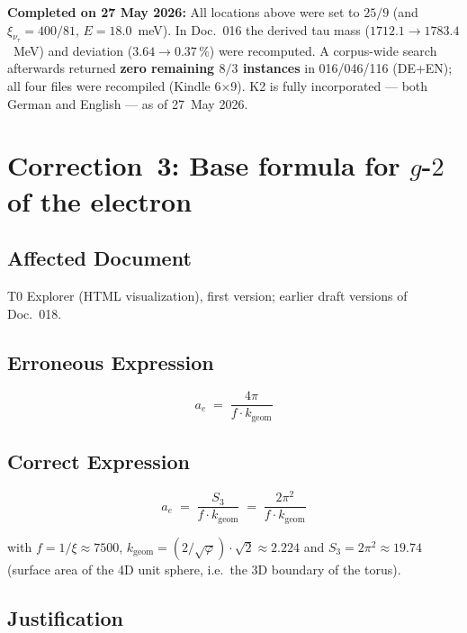 \noindent\textbf{Completed on 27 May 2026:} All locations above were set
to $25/9$ (and $\xi_{\nu_\tau} = 400/81$, $E = 18.0$~meV). In Doc.~016 the
derived tau mass ($1712.1 \to 1783.4$~MeV) and deviation
($3.64 \to 0.37\,\%$) were recomputed. A corpus-wide search afterwards
returned \textbf{zero remaining $8/3$ instances} in 016/046/116 (DE+EN);
all four files were recompiled (Kindle 6×9). K2 is fully incorporated ---
both German and English --- as of 27~May 2026.

\section{\texorpdfstring{Correction~3: Base formula for $g$-$2$ of the electron}{Correction 3: Base formula for g-2 of the electron}}

\subsection*{Affected Document}

T0 Explorer (HTML visualization), first version; earlier draft versions
of Doc.~018.

\subsection*{Erroneous Expression}

\begin{equation}
  a_e \;=\; \frac{4\pi}{f \cdot k_{\text{geom}}}
  \tag{old -- wrong}
\end{equation}

\subsection*{Correct Expression}

\begin{equation}
  \boxed{
    a_e \;=\; \frac{S_3}{f \cdot k_{\text{geom}}}
    \;=\; \frac{2\pi^2}{f \cdot k_{\text{geom}}}
  }
  \tag{190.4}
\end{equation}

with $f = 1/\xi \approx 7500$, $k_{\text{geom}} = (2/\sqrt{\varphi})\cdot\sqrt{2} \approx 2.224$
and $S_3 = 2\pi^2 \approx 19.74$ (surface area of the 4D unit sphere,
i.e.\ the 3D boundary of the torus).

\subsection*{Justification}

